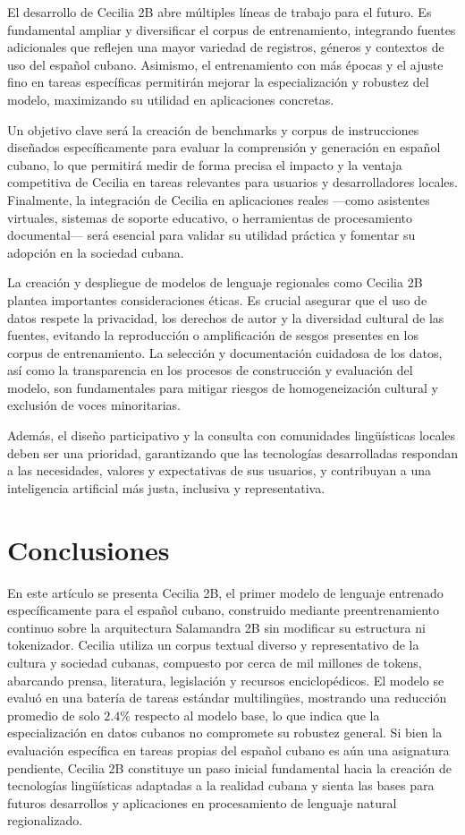 \documentclass[10pt,twoside]{rcmart} %
\begin{document}
El desarrollo de Cecilia 2B abre múltiples líneas de trabajo para el futuro. Es fundamental ampliar y diversificar el corpus de entrenamiento, integrando fuentes adicionales que reflejen una mayor variedad de registros, géneros y contextos de uso del español cubano. Asimismo, el entrenamiento con más épocas y el ajuste fino en tareas específicas permitirán mejorar la especialización y robustez del modelo, maximizando su utilidad en aplicaciones concretas.

Un objetivo clave será la creación de benchmarks y corpus de instrucciones diseñados específicamente para evaluar la comprensión y generación en español cubano, lo que permitirá medir de forma precisa el impacto y la ventaja competitiva de Cecilia en tareas relevantes para usuarios y desarrolladores locales. Finalmente, la integración de Cecilia en aplicaciones reales —como asistentes virtuales, sistemas de soporte educativo, o herramientas de procesamiento documental— será esencial para validar su utilidad práctica y fomentar su adopción en la sociedad cubana.

La creación y despliegue de modelos de lenguaje regionales como Cecilia 2B plantea importantes consideraciones éticas. Es crucial asegurar que el uso de datos respete la privacidad, los derechos de autor y la diversidad cultural de las fuentes, evitando la reproducción o amplificación de sesgos presentes en los corpus de entrenamiento. La selección y documentación cuidadosa de los datos, así como la transparencia en los procesos de construcción y evaluación del modelo, son fundamentales para mitigar riesgos de homogeneización cultural y exclusión de voces minoritarias.

Además, el diseño participativo y la consulta con comunidades lingüísticas locales deben ser una prioridad, garantizando que las tecnologías desarrolladas respondan a las necesidades, valores y expectativas de sus usuarios, y contribuyan a una inteligencia artificial más justa, inclusiva y representativa.

\section{Conclusiones}\label{sec:conc}

En este artículo se presenta Cecilia 2B, el primer modelo de lenguaje entrenado específicamente para el español cubano, construido mediante preentrenamiento continuo sobre la arquitectura Salamandra 2B sin modificar su estructura ni tokenizador. Cecilia utiliza un corpus textual diverso y representativo de la cultura y sociedad cubanas, compuesto por cerca de mil millones de tokens, abarcando prensa, literatura, legislación y recursos enciclopédicos. El modelo se evaluó en una batería de tareas estándar multilingües, mostrando una reducción promedio de solo $2.4$\% respecto al modelo base, lo que indica que la especialización en datos cubanos no compromete su robustez general. Si bien la evaluación específica en tareas propias del español cubano es aún una asignatura pendiente, Cecilia 2B constituye un paso inicial fundamental hacia la creación de tecnologías lingüísticas adaptadas a la realidad cubana y sienta las bases para futuros desarrollos y aplicaciones en procesamiento de lenguaje natural regionalizado.
\end{document}
